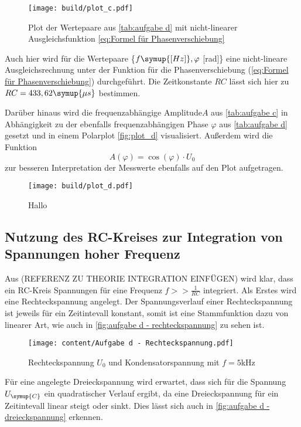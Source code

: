 \begin{figure}
  \centering
  \texttt{[image: build/plot\_c.pdf]}
  \caption{Plot der Wertepaare aus \autoref{tab:aufgabe d} mit nicht-linearer%
   Ausgleichsfunktion \autoref{eq:Formel für Phasenverschiebung}}
  \label{fig:plot_c}
\end{figure}

Auch hier wird für die Wertepaare \{$f \symup{[Hz]}, \varphi$ [rad]\} eine nicht-lineare Ausgleichsrechnung unter 
der Funktion für die Phasenverschiebung (\autoref{eq:Formel für Phasenverschiebung}) durchgeführt. Die Zeitkonstante $RC$ lässt sich
hier zu $RC = 433,62\symup{\mu s}$ bestimmen.

Darüber hinaus wird die frequenzabhängige Amplitude$A$ aus \autoref{tab:aufgabe c} in Abhängigkeit zu der
ebenfalls frequenzabhängigen Phase $\varphi$ aus \autoref{tab:aufgabe d} gesetzt und in einem Polarplot \autoref{fig:plot_d}
visualisiert. Außerdem wird die Funktion 
\begin{equation}
  A(\varphi) = \cos (\varphi) \cdot U_{0}
\end{equation}
zur besseren Interpretation der Messwerte ebenfalls auf den Plot aufgetragen.

\begin{figure}
  \centering
  \texttt{[image: build/plot\_d.pdf]}
  \caption{Hallo}
  \label{fig:plot_d}
\end{figure}

\subsection{Nutzung des RC-Kreises zur Integration von Spannungen hoher Frequenz}
Aus (REFERENZ ZU THEORIE INTEGRATION EINFÜGEN) wird klar, dass ein RC-Kreis Spannungen für eine Frequenz $f >> \frac{1}{RC}$
integriert. Als Erstes wird eine Rechteckspannung angelegt. Der Spannungsverlauf einer Rechteckspannung ist jeweils für ein
Zeitintevall konstant, somit ist eine Stammfunktion dazu von linearer Art, wie auch in \autoref{fig:aufgabe d - rechteckspannung}
zu sehen ist.

\begin{figure}
  \centering
  \texttt{[image: content/Aufgabe d - Rechteckspannung.pdf]}
  \caption{Rechteckspannung $U_{0}$ und Kondensatorspannung mit $f=5$kHz}
  \label{fig:aufgabe d - rechteckspannung}
\end{figure}

Für eine angelegte Dreieckspannung wird erwartet, dass sich für die Spannung $U_{\symup{C}}$ ein quadratischer Verlauf ergibt,
da eine Dreieckspannung für ein Zeitintevall linear steigt oder sinkt. Dies lässt sich auch in \autoref{fig:aufgabe d - dreieckspannung}
erkennen.


